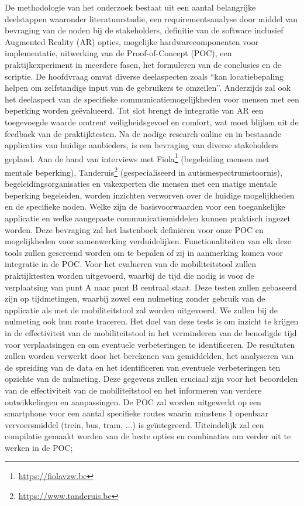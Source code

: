 De methodologie van het onderzoek bestaat uit een aantal belangrijke deelstappen waaronder literatuurstudie, een requirementsanalyse door middel van bevraging van de noden bij de stakeholders, definitie van de software inclusief Augmented Reality (AR) opties, mogelijke hardwarecomponenten voor implementatie, uitwerking van de Proof-of-Concept (POC), een praktijkexperiment in meerdere fasen, het formuleren van de conclusies en de scriptie. De hoofdvraag omvat diverse deelaspecten zoals ``kan locatiebepaling helpen om zelfstandige input van de gebruikers te omzeilen''. Anderzijds zal ook het deelaspect van de specifieke communicatiemogelijkheden voor mensen met een beperking worden geëvalueerd. Tot slot brengt de integratie van AR een toegevoegde waarde omtrent veiligheidsgevoel en comfort, wat moet blijken uit de feedback van de praktijktesten. Na de nodige research online en in bestaande applicaties van huidige aanbieders, is een bevraging van diverse stakeholders gepland. Aan de hand van interviews met Fiola\footnote{\url{https://fiolavzw.be}} (begeleiding mensen met mentale beperking), Tanderuis\footnote{\url{https://www.tanderuis.be}} (gespecialiseerd in autismespectrumstoornis), begeleidingsorganisaties en vakexperten die mensen met een matige mentale beperking begeleiden, worden inzichten verworven over de huidige mogelijkheden en de specifieke noden. Welke zijn de basisvoorwaarden voor een toegankelijke applicatie en welke aangepaste communicatiemiddelen kunnen praktisch ingezet worden. Deze bevraging zal het lastenboek definiëren voor onze POC en mogelijkheden voor samenwerking verduidelijken.
Functionaliteiten van elk deze tools zullen gescreend worden om te bepalen of zij in aanmerking komen voor integratie in de POC.
Voor het evalueren van de mobiliteitstool zullen praktijktesten worden uitgevoerd, waarbij de tijd die nodig is voor de verplaatsing van punt A naar punt B centraal staat. 
Deze testen zullen gebaseerd zijn op tijdmetingen, waarbij zowel een nulmeting zonder gebruik van de applicatie als met de mobiliteitstool zal worden uitgevoerd. We zullen bij de nulmeting ook hun route traceren.
Het doel van deze tests is om inzicht te krijgen in de effectiviteit van de mobiliteitstool in het verminderen van de benodigde tijd voor verplaatsingen en om eventuele verbeteringen te identificeren. 
De resultaten zullen worden verwerkt door het berekenen van gemiddelden, het analyseren van de spreiding van de data en het identificeren van eventuele verbeteringen ten opzichte van de nulmeting. Deze gegevens zullen cruciaal zijn voor het beoordelen van de effectiviteit van de mobiliteitstool en het informeren van verdere ontwikkelingen en aanpassingen. De POC zal worden uitgewerkt op een smartphone voor een aantal specifieke routes waarin minstens 1 openbaar vervoersmiddel (trein, bus, tram, ...) is geïntegreerd. Uiteindelijk zal een compilatie gemaakt worden van de beste opties en combinaties om verder uit te werken in de POC; 


